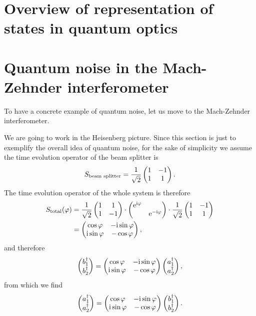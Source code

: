 \documentclass[hyperref, a4paper]{article}
\newcommand*{\ii}{\mathrm{i}}
\newcommand*{\ee}{\mathrm{e}}
\begin{document}
\section{Overview of representation of states in quantum optics}\label{sec:overview-rep}

\section{Quantum noise in the Mach-Zehnder interferometer}\label{sec:interferometer}



To have a concrete example of quantum noise, 
let us move to the Mach-Zehnder interferometer.

We are going to work in the Heisenberg picture. 
Since this section is just to exemplify the overall idea of quantum noise,
for the sake of simplicity we assume the time evolution operator of the beam splitter is 
\begin{equation}
    S_{\text{beam splitter}} = \frac{1}{\sqrt{2}} \pmqty{ 1 & -1 \\ 1 & 1 } .
\end{equation}
The time evolution operator of the whole system is therefore
\begin{equation}
    \begin{aligned}
        S_\text{total}(\varphi) &= \frac{1}{\sqrt{2}} \pmqty{ 1 & 1 \\ 1 & -1 } \cdot \pmqty{\dmat{\ee^{\ii \varphi}, \ee^{- \ii \varphi}}} \cdot \frac{1}{\sqrt{2}} \pmqty{ 1 & -1 \\ 1 & 1 } \\
        &= \pmqty{ \cos \varphi & - \ii \sin \varphi \\ \ii \sin \varphi & - \cos \varphi },
    \end{aligned}
    \label{eq:total-matrix}
\end{equation} 
and therefore 
\[
    \pmqty{b_1^\dagger \\ b_2^\dagger} = \pmqty{ \cos \varphi & - \ii \sin \varphi \\ \ii \sin \varphi & - \cos \varphi } \pmqty{a_1^\dagger \\ a_2^\dagger},
\]
from which we find 
\begin{equation}
    \pmqty{a_1^\dagger \\ a_2^\dagger} = \pmqty{ \cos \varphi & - \ii \sin \varphi \\ \ii \sin \varphi & - \cos \varphi } \pmqty{b_1^\dagger \\ b_2^\dagger}.
\end{equation}
\end{document}
